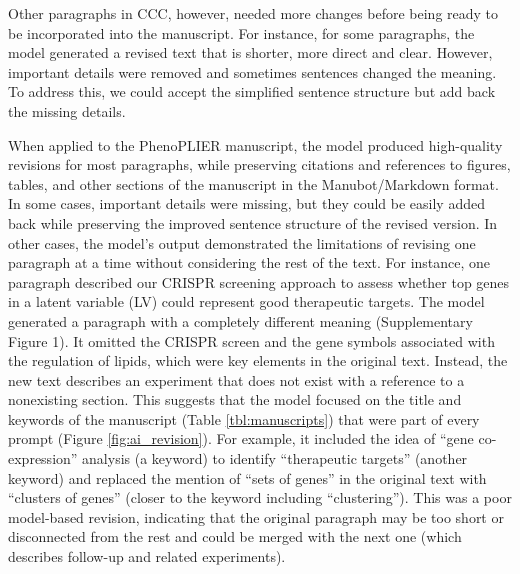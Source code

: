 \documentclass[
]{article}
\begin{document}
Other paragraphs in CCC, however, needed more changes before being ready to be incorporated into the manuscript.
For instance, for some paragraphs, the model generated a revised text that is shorter, more direct and clear.
However, important details were removed and sometimes sentences changed the meaning.
To address this, we could accept the simplified sentence structure but add back the missing details.

% 

When applied to the PhenoPLIER manuscript, the model produced high-quality revisions for most paragraphs, while preserving citations and references to figures, tables, and other sections of the manuscript in the Manubot/Markdown format.
In some cases, important details were missing, but they could be easily added back while preserving the improved sentence structure of the revised version.
In other cases, the model's output demonstrated the limitations of revising one paragraph at a time without considering the rest of the text.
For instance, one paragraph described our CRISPR screening approach to assess whether top genes in a latent variable (LV) could represent good therapeutic targets.
The model generated a paragraph with a completely different meaning (Supplementary Figure 1).
It omitted the CRISPR screen and the gene symbols associated with the regulation of lipids, which were key elements in the original text.
Instead, the new text describes an experiment that does not exist with a reference to a nonexisting section.
This suggests that the model focused on the title and keywords of the manuscript (Table \ref{tbl:manuscripts}) that were part of every prompt (Figure \ref{fig:ai_revision}).
For example, it included the idea of ``gene co-expression'' analysis (a keyword) to identify ``therapeutic targets'' (another keyword) and replaced the mention of ``sets of genes'' in the original text with ``clusters of genes'' (closer to the keyword including ``clustering'').
This was a poor model-based revision, indicating that the original paragraph may be too short or disconnected from the rest and could be merged with the next one (which describes follow-up and related experiments).
\end{document}
